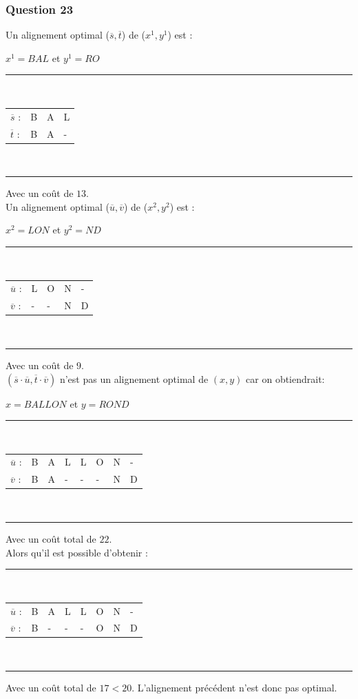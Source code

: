 \documentclass[12pt, a4paper]{report}
\begin{document}
\subsubsection{Question 23}
Un alignement optimal ($\overline{s},\overline{t}$) de ($x^{1},y^{1}$) est :
\begin{center}
$x^{1}=BAL$ et $y^{1}=RO$\\
\rule{0.4\textwidth}{.4pt}\\
\begin{tabular}{llll}
$\overline{s}$ :&B&A&L\\
$\overline{t}$ :&B&A&-\\
\end{tabular}\\
\rule{0.4\textwidth}{.4pt}
\end{center}
Avec un coût de $13$.\\
Un alignement optimal ($\overline{u},\overline{v}$) de ($x^{2},y^{2}$) est :
\begin{center}
$x^{2}=LON$ et $y^{2}=ND$\\
\rule{0.4\textwidth}{.4pt}\\
\begin{tabular}{lllll}
$\overline{u}$ :&L&O&N&-\\
$\overline{v}$ :&-&-&N&D\\
\end{tabular}\\
\rule{0.4\textwidth}{.4pt}
\end{center}
Avec un coût de $9$.\\

$(\overline{s} \cdot \overline{u},\overline{t} \cdot \overline{v})$ n'est pas un alignement optimal de $(x,y)$ car on obtiendrait:
\begin{center}
$x=BALLON$ et $y=ROND$\\
\rule{0.4\textwidth}{.4pt}\\
\begin{tabular}{llllllll}
$\overline{u}$ :&B&A&L&L&O&N&-\\
$\overline{v}$ :&B&A&-&-&-&N&D\\
\end{tabular}\\
\rule{0.4\textwidth}{.4pt}
\end{center}
Avec un coût total de $22$.\\

Alors qu'il est possible d'obtenir :
 \begin{center}
\rule{0.4\textwidth}{.4pt}\\
\begin{tabular}{llllllll}
$\overline{u}$ :&B&A&L&L&O&N&-\\
$\overline{v}$ :&B&-&-&-&O&N&D\\
\end{tabular}\\
\rule{0.4\textwidth}{.4pt}
\end{center}
Avec un coût total de $17<20$. L'alignement précédent n'est donc pas optimal.\\
\end{document}
